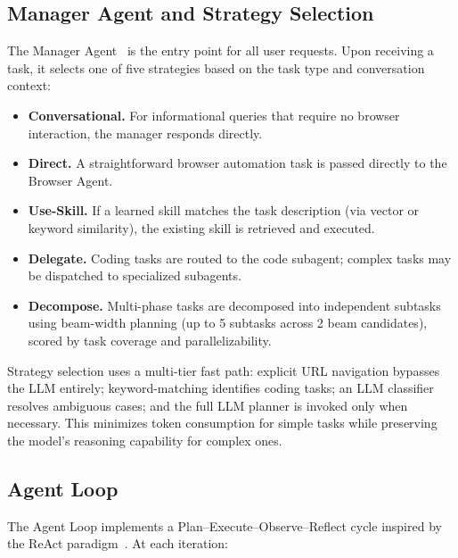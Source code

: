 \subsection{Manager Agent and Strategy Selection}

The Manager Agent~\cite{browseruse} is the entry point for all user requests. Upon receiving a task, it selects one of five strategies based on the task type and conversation context:

\begin{itemize}[leftmargin=*,itemsep=1pt]
    \item \textbf{Conversational.} For informational queries that require no browser interaction, the manager responds directly.
    \item \textbf{Direct.} A straightforward browser automation task is passed directly to the Browser Agent.
    \item \textbf{Use-Skill.} If a learned skill matches the task description (via vector or keyword similarity), the existing skill is retrieved and executed.
    \item \textbf{Delegate.} Coding tasks are routed to the code subagent; complex tasks may be dispatched to specialized subagents.
    \item \textbf{Decompose.} Multi-phase tasks are decomposed into independent subtasks using beam-width planning (up to 5 subtasks across 2 beam candidates), scored by task coverage and parallelizability.
\end{itemize}

Strategy selection uses a multi-tier fast path: explicit URL navigation bypasses the LLM entirely; keyword-matching identifies coding tasks; an LLM classifier resolves ambiguous cases; and the full LLM planner is invoked only when necessary. This minimizes token consumption for simple tasks while preserving the model's reasoning capability for complex ones.

\subsection{Agent Loop}

The Agent Loop implements a Plan--Execute--Observe--Reflect cycle inspired by the ReAct paradigm~\cite{react}. At each iteration:

